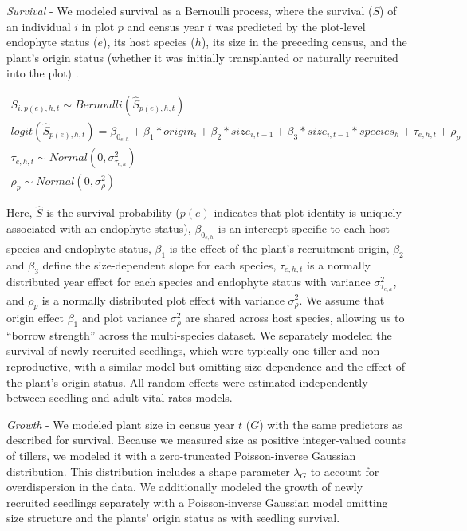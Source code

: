 \documentclass[12pt]{article}
\begin{document}
\emph{Survival} - We modeled survival as a Bernoulli process, where the survival ($S$) of an individual $i$ in plot $p$ and census year $t$ was predicted by the plot-level endophyte status ($e$), its host species ($h$), its size in the preceding census, and the plant's origin status (whether it was initially transplanted or naturally recruited into the plot) .

\begin{subequations}
	\label{eq:survival}
	\begin{align}
	    S_{i,p(e),h,t} \sim Bernoulli(\hat{S}_{p(e),h,t})\\
	    logit(\hat{S}_{p(e),h,t}) = \beta_{0_{e,h}} + \beta_{1}*origin_{i} + \beta_{2}*size_{i,t-1} + \beta_{3}*size_{i,t-1}*species_{h} + \tau_{e,h,t} + \rho_{p}\\
	    \tau_{e,h,t} \sim Normal(0,\sigma^2_{\tau_{e,h}})\\
	    \rho_{p} \sim Normal(0,\sigma^2_{\rho})
	\end{align}
\end{subequations}

Here, $\hat{S}$ is the survival probability ($p(e)$ indicates that plot identity is uniquely associated with an endophyte status), $\beta_{0_{e,h}}$ is an intercept specific to each host species and endophyte status, $\beta_1$ is the effect of the plant's recruitment origin, $\beta_2$ and $\beta_3$ define the size-dependent slope for each species, $\tau_{e,h,t}$ is a normally distributed year effect for each species and endophyte status with variance $\sigma^2_{\tau_{e,h}}$, and $\rho_{p}$ is a normally distributed plot effect with variance $\sigma^2_{\rho}$.
We assume that origin effect $\beta_1$ and plot variance $\sigma^2_{\rho}$ are shared across host species, allowing us to ``borrow strength'' across the multi-species dataset.
We separately modeled the survival of newly recruited seedlings, which were typically one tiller and non-reproductive, with a similar model but omitting size dependence and the effect of the plant's origin status. 
All random effects were estimated independently between seedling and adult vital rates models.


\emph{Growth} - We modeled plant size in census year $t$ ($G$) with the same predictors as described for survival.
Because we measured size as positive integer-valued counts of tillers, we modeled it with a zero-truncated Poisson-inverse Gaussian distribution.
This distribution includes a shape parameter $\lambda_G$ to account for overdispersion in the data.
We additionally modeled the growth of newly recruited seedlings separately with a Poisson-inverse Gaussian model omitting size structure and the plants' origin status as with seedling survival.
\end{document}
